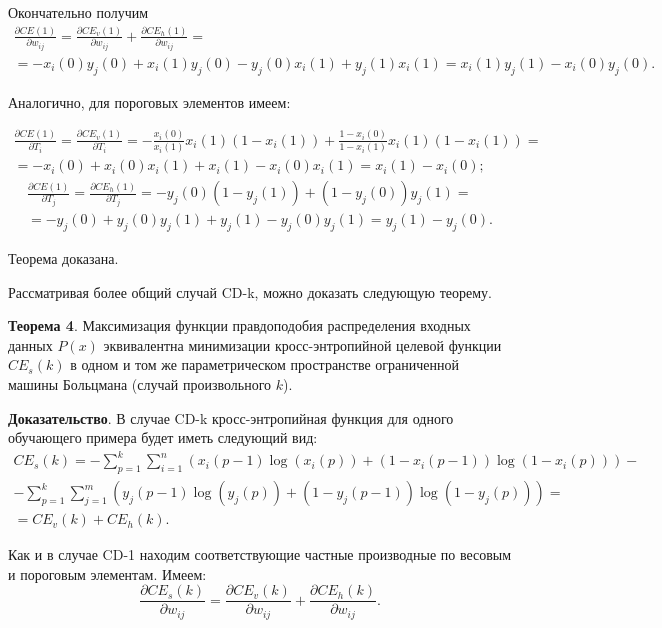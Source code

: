 Окончательно получим
\begin{multline*}
	\frac{\partial CE(1)}{\partial w_{ij}} = \frac{\partial CE_v(1)}{\partial w_{ij}} + \frac{\partial CE_h(1)}{\partial w_{ij}} = \\ = -x_i(0)y_j(0)+x_i(1)y_j(0) -y_j(0)x_i(1)+y_j(1)x_i(1) = x_i(1)y_j(1) - x_i(0)y_j(0).
\end{multline*}

Аналогично, для пороговых элементов имеем:

\begin{multline*}
	\frac{\partial CE(1)}{\partial T_i} = \frac{\partial CE_v(1)}{\partial T_i} = -\frac{x_i(0)}{x_i(1)}x_i(1)(1-x_i(1))+\frac{1-x_i(0)}{1-x_i(1)}x_i(1)(1-x_i(1)) = \\ = -x_i(0) + x_i(0)x_i(1)+x_i(1)-x_i(0)x_i(1) = x_i(1)-x_i(0);
\end{multline*}
\begin{multline*}
	\frac{\partial CE(1)}{\partial T_j} = \frac{\partial CE_h(1)}{\partial T_j} = -y_j(0)(1-y_j(1)) + (1-y_j(0))y_j(1) = \\ = -y_j(0) + y_j(0)y_j(1) + y_j(1) - y_j(0)y_j(1) = y_j(1) - y_j(0).
\end{multline*}

Теорема доказана. 

Рассматривая более общий случай CD-k, можно доказать следующую теорему.

\textbf{Теорема 4}. Максимизация функции правдоподобия распределения входных данных $P(x)$ эквивалентна минимизации кросс-энтропийной целевой функции $CE_s(k)$ в одном и том же параметрическом пространстве ограниченной машины Больцмана (случай произвольного $k$).

\textbf{Доказательство}. В случае CD-k кросс-энтропийная функция для одного обучающего примера будет иметь следующий вид:
\begin{multline}
	CE_s(k) = -\sum_{p=1}^k \sum_{i=1}^n (x_i(p-1)\log(x_i(p)) + (1-x_i(p-1))\log(1-x_i(p)))-\\-\sum_{p=1}^k \sum_{j=1}^m (y_j(p-1)\log (y_j(p))+(1-y_j(p-1))\log(1-y_j(p))) = \\ = CE_v(k) + CE_h(k).
\end{multline}

Как и в случае CD-1 находим соответствующие частные производные по весовым и пороговым элементам. Имеем:
\begin{equation*}
	\frac{\partial CE_s(k)}{\partial w_{ij}}= \frac{\partial CE_v(k)}{\partial w_{ij}} + \frac{\partial CE_h(k)}{\partial w_{ij}}.
\end{equation*}

